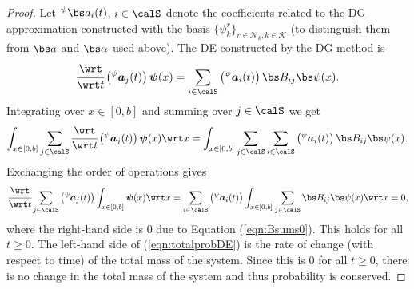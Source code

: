 \begin{proof}
Let \( {}^\psi \bs a_i(t)\), \(i\in\calS\) denote the coefficients related to the DG approximation constructed with the basis \(\{\psi^r_k\}_{r\in\mathcal N_k,k\in\mathcal K}\) (to distinguish them from \(\bs a\) and \(\bs \alpha\) used above). The DE constructed by the DG method is
\begin{align*}
	\cfrac{\wrt}{\wrt t}\left({}^\psi \boldsymbol a_j (t)\right)\boldsymbol \psi(x) = \sum_{i\in\calS}\left({}^\psi \boldsymbol a_i (t)\right)\bs B_{ij}\bs\psi(x).
\end{align*}
Integrating over \(x\in [0,b]\) and summing over \(j\in\calS\) we get
\begin{align*}
	\int_{x\in[0,b]}\sum_{j\in\calS}\cfrac{\wrt}{\wrt t}\left({}^\psi \boldsymbol a_j (t)\right)\boldsymbol \psi(x)\wrt x = \int_{x\in[0,b]}\sum_{j\in\calS}\sum_{i\in\calS}\left({}^\psi \boldsymbol a_i (t)\right)\bs B_{ij}\bs\psi(x).
\end{align*}
Exchanging the order of operations gives 
\begin{align}\label{eqn:totalprobDE}
	\cfrac{\wrt}{\wrt t}\sum_{j\in\calS} \left({}^\psi \boldsymbol a_j (t)\right)\int_{x\in[0,b]} \boldsymbol \psi(x)\wrt x =  \sum_{i\in\calS}\left({}^\psi \boldsymbol a_i (t)\right)\int_{x\in[0,b]}\sum_{j\in\calS}\bs B_{ij}\bs\psi(x)\wrt x = 0,
\end{align}
where the right-hand side is \(0\) due to Equation (\ref{eqn:Bsums0}). This holds for all \(t\geq 0\). The left-hand side of (\ref{eqn:totalprobDE}) is the rate of change (with respect to time) of the total mass of the system. Since this is \( 0\) for all \(t\geq 0\), there is no change in the total mass of the system and thus probability is conserved. 
\end{proof}
